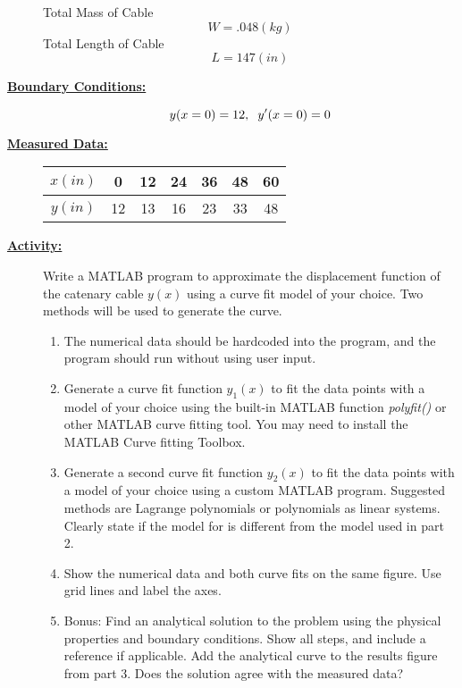 \documentclass[12pt]{article}
\begin{document}
\begin{description}
  Total Mass of Cable
 	\[W = .048 (kg) \]
 	Total Length of Cable 
 	\[L = 147 (in) \]

  \item[\textbf{\underline{Boundary Conditions:}}] \hfill \vspace{0mm}
  
  \[y(x=0)=12, \hspace{2mm} y'(x=0)=0 \]


  \item[\textbf{\underline{Measured Data:}}] \hfill \vspace{0mm}
 
   \begin{tabular}{|c|c|c|c|c|c|c|} \hline
   $x(in)$&0&12&24&36&48&60\\ \hline
   $y(in)$&12&13&16&23&33&48\\ \hline 
   \end{tabular}


\newpage
\item[\textbf{\underline{Activity:}}] \hfill \vspace{0mm}

Write a MATLAB program to approximate the displacement function of the catenary cable $y(x)$ using a curve fit model of your choice. Two methods will be used to generate the curve.

\begin{enumerate}	
	
	\item The numerical data should be hardcoded into the program, and the program should run without using user input. 

	\item Generate a curve fit function $y_1(x)$ to fit the data points with a model of your choice using the built-in MATLAB function {\it polyfit()} or other MATLAB curve fitting tool. You may need to install the MATLAB Curve fitting Toolbox. 

	\item Generate a second curve fit function $y_2(x)$ to fit the data points with a model of your choice using a custom MATLAB program. Suggested methods are Lagrange polynomials or polynomials as linear systems. Clearly state if the model for is different from the model used in part 2.

	\item Show the numerical data and both curve fits on the same figure. Use grid lines and label the axes.

	\item Bonus: Find an analytical solution to the problem using the physical properties and boundary conditions. Show all steps, and include a reference if applicable. Add the analytical curve to the results figure from part 3. Does the solution agree with the measured data?


\end{enumerate}
\end{description}
\end{document}
